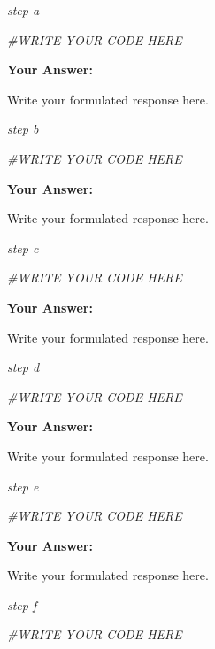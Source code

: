\documentclass[
]{article}
\newenvironment{Shaded}{\begin{snugshade}}{\end{snugshade}}
\newcommand{\CommentTok}[1]{\textcolor[rgb]{0.56,0.35,0.01}{\textit{#1}}}
\begin{document}
\emph{step a}

\begin{Shaded}
\begin{Highlighting}[]
\CommentTok{\#WRITE YOUR CODE HERE}
\end{Highlighting}
\end{Shaded}

\textbf{Your Answer:}

Write your formulated response here.

\emph{step b}

\begin{Shaded}
\begin{Highlighting}[]
\CommentTok{\#WRITE YOUR CODE HERE}
\end{Highlighting}
\end{Shaded}

\textbf{Your Answer:}

Write your formulated response here.

\emph{step c}

\begin{Shaded}
\begin{Highlighting}[]
\CommentTok{\#WRITE YOUR CODE HERE}
\end{Highlighting}
\end{Shaded}

\textbf{Your Answer:}

Write your formulated response here.

\emph{step d}

\begin{Shaded}
\begin{Highlighting}[]
\CommentTok{\#WRITE YOUR CODE HERE}
\end{Highlighting}
\end{Shaded}

\textbf{Your Answer:}

Write your formulated response here.

\emph{step e}

\begin{Shaded}
\begin{Highlighting}[]
\CommentTok{\#WRITE YOUR CODE HERE}
\end{Highlighting}
\end{Shaded}

\textbf{Your Answer:}

Write your formulated response here.

\emph{step f}

\begin{Shaded}
\begin{Highlighting}[]
\CommentTok{\#WRITE YOUR CODE HERE}
\end{Highlighting}
\end{Shaded}
\end{document}
